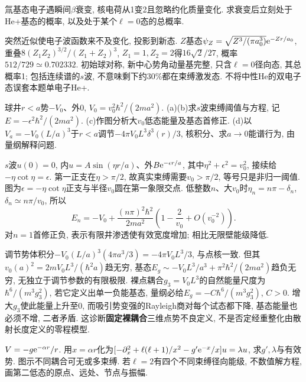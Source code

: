\begin{exercise}
氚基态电子遇瞬间$\beta$衰变, 核电荷从1变2且忽略约化质量变化. 求衰变后立刻处于He+基态的概率, 以及处于某个$\ell=0$态的总概率.
\end{exercise}
\begin{solution}
突然近似使电子波函数来不及变化, 投影到新态. $Z$基态$\psi_Z=\sqrt{Z^3/(\pi a_0^3)}\mathrm e^{-Zr/a_0}$, 重叠$8(Z_1Z_2)^{3/2}/(Z_1+Z_2)^3$, $Z_1=1,Z_2=2$得$16\sqrt2/27$, 概率$512/729\simeq0.702332$. 初始球对称, 新中心势角动量基完整, 只含$\ell=0$径向态, 其总概率1; 包括连续谱的$s$波, 不意味剩下约30\%都在束缚激发态. 不将中性He的双电子态误套本题单电子He+.
\end{solution}
\begin{exercise}
球井$r<a$势$-V_0$、外0, $V_0=v_0^2\hbar^2/(2ma^2)$. (a)(b)求$s$波束缚阈值与方程, 记$E=-\epsilon^2\hbar^2/(2ma^2)$. (c)作图分析大$v_0$低态能量及基态首修正. (d)以$V_a=-V_0(L/a)^3$于$r<a$调节$-4\pi V_0L^3\delta^3(r)/3$, 核积分、求$a\to0$能谱行为, 由量纲解释问题.
\end{exercise}
\begin{solution}
$s$波$u(0)=0$, 内$u=A\sin(\eta r/a)$、外$B\mathrm e^{-\epsilon r/a}$, 其中$\eta^2+\epsilon^2=v_0^2$, 接续给$-\eta\cot\eta=\epsilon$. 第一正支在$\eta>\pi/2$, 故真实束缚需要$v_0>\pi/2$, 等号只是非归一阈值. 图为$\epsilon=-\eta\cot\eta$正支与半径$v_0$圆在第一象限交点. 低整数$n$、大$v_0$时$\eta_n=n\pi-\delta_n$, $\delta_n\simeq n\pi/v_0$, 所以
\[
E_n=-V_0+\frac{(n\pi)^2\hbar^2}{2ma^2}
\left(1-\frac2{v_0}+O(v_0^{-2})\right).
\]
对$n=1$首修正负, 表示有限井渗透使有效宽度增加; 相比无限壁能级降低.


调节势体积分$-V_0(L/a)^3(4\pi a^3/3)=-4\pi V_0L^3/3$, 与点核一致. 但其$v_0(a)^2=2mV_0L^3/(\hbar^2a)$趋无穷, 基态$E_g\sim-V_0L^3/a^3+\pi^2\hbar^2/(2ma^2)$趋负无穷, 无独立于调节参数的有限极限. 裸点耦合$g_3=V_0L^3$的自然能量尺度为$\hbar^6/(m^3g_3^2)$, 若它定义出单一负能基态, 量纲必给$E_g=-C\hbar^6/(m^3g_3^2)$, $C>0$. 增大$g_3$使此能量上升至0, 而吸引势变强的Rayleigh商对每个试态都下降, 基态能量也必须不增, 二者矛盾. 这诊断\textbf{固定裸耦合}三维点势不良定义, 不是否定经重整化由散射长度定义的零程模型.
\end{solution}
\begin{exercise}
$V=-g\mathrm e^{-\alpha r}/r$. 用$x=\alpha r$化为$[-\partial_x^2+\ell(\ell+1)/x^2-g'\mathrm e^{-x}/x]u=\lambda u$, 求$g',\lambda$与有效势. 图示不同耦合可无或多束缚. 若$\ell=2$有四个不同束缚径向能级, 不数值解方程, 画第二低态的原点、远处、节点与振幅.
\end{exercise}
